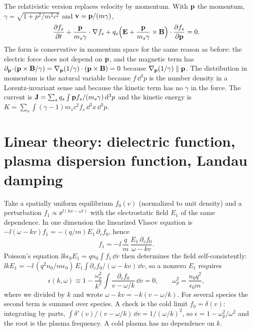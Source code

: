 The relativistic version replaces velocity by momentum. With $\mathbf p$ the momentum, $\gamma=\sqrt{1+p^2/m^2c^2}$ and $\mathbf v=\mathbf p/(m\gamma)$,
\begin{equation}
\frac{\partial f_s}{\partial t}+\frac{\mathbf p}{m_s\gamma}\cdot\nabla f_s+q_s\Big(\mathbf E+\frac{\mathbf p}{m_s\gamma}\times\mathbf B\Big)\cdot\frac{\partial f_s}{\partial \mathbf p}=0 .\label{eq:vlasovRel}
\end{equation}
The form is conservative in momentum space for the same reason as before: the electric force does not depend on $\mathbf p$, and the magnetic term has $\partial_{\mathbf p}\!\cdot\!(\mathbf p\times\mathbf B/\gamma)=\nabla_{\mathbf p}(1/\gamma)\cdot(\mathbf p\times\mathbf B)=0$ because $\nabla_{\mathbf p}(1/\gamma)\parallel\mathbf p$. The distribution in momentum is the natural variable because $f\,\dd^3p$ is the number density in a Lorentz-invariant sense and because the kinetic term has no $\gamma$ in the force. The current is $\mathbf J=\sum_sq_s\int\mathbf p f_s/(m_s\gamma)\,\mathrm{d}^3p$ and the kinetic energy is $K=\sum_s\int(\gamma-1)m_sc^2f_s\,\dd^3x\,\dd^3p$.

\section{Linear theory: dielectric function, plasma dispersion function, Landau damping}\label{sec:linear}

Take a spatially uniform equilibrium $f_0(v)$ (normalized to unit density) and a perturbation $f_1\propto\ee^{\ii(kx-\omega t)}$ with the electrostatic field $E_1$ of the same dependence. In one dimension the linearized Vlasov equation is $-\ii(\omega-kv)f_1=-(q/m)E_1\,\partial_vf_0$, hence
\begin{equation}
f_1=-\ii\,\frac{q}{m}\,\frac{E_1\,\partial_vf_0}{\omega-kv} .\label{eq:f1}
\end{equation}
Poisson's equation $\ii k\epsilon_0E_1=q n_0\int f_1\,\dd v$ then determines the field self-consistently: $\ii kE_1=-\ii\,(q^2n_0/m\epsilon_0)\,E_1\int\partial_vf_0/(\omega-kv)\,\dd v$, so a nonzero $E_1$ requires
\begin{equation}
\epsilon(k,\omega)\equiv1-\frac{\omega_p^2}{k^2}\int\frac{\partial_vf_0}{v-\omega/k}\,\dd v=0 ,\qquad \omega_p^2=\frac{n_0q^2}{\epsilon_0m} ,\label{eq:eps}
\end{equation}
where we divided by $k$ and wrote $\omega-kv=-k(v-\omega/k)$. For several species the second term is summed over species. A check is the cold limit $f_0=\delta(v)$: integrating by parts, $\int\delta'(v)/(v-\omega/k)\,\dd v=1/(\omega/k)^2$, so $\epsilon=1-\omega_p^2/\omega^2$ and the root is the plasma frequency. A cold plasma has no dependence on $k$.

